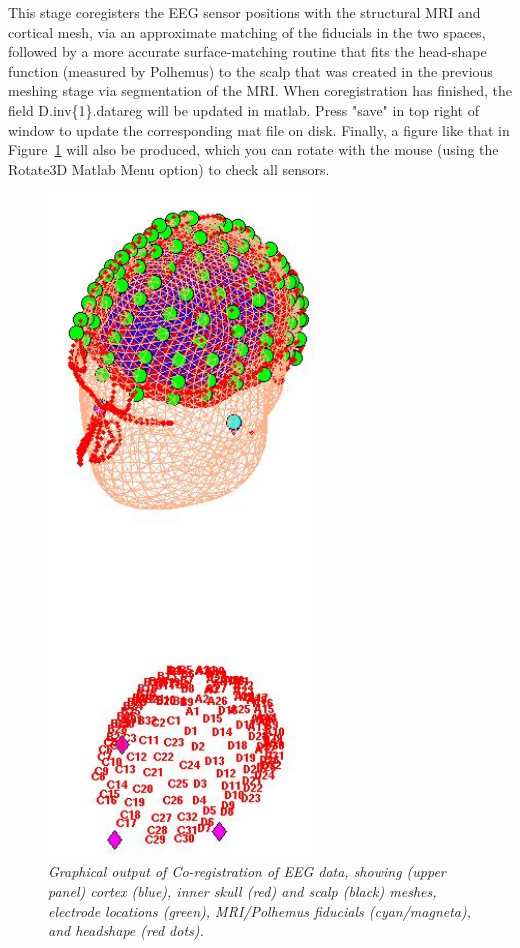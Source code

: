 This stage coregisters the EEG sensor positions with the structural MRI and cortical mesh, via an approximate matching of the fiducials in the two spaces, followed by a more accurate surface-matching routine that fits the head-shape function (measured by Polhemus) to the scalp that was created in the previous meshing stage via segmentation of the MRI. When coregistration has finished, the field D.inv\{1\}.datareg will be updated in matlab. Press "save" in top right of window to update the corresponding mat file on disk. Finally, a figure like that in Figure~\ref{fig_32_8} will also be produced, which you can rotate with the mouse (using the Rotate3D Matlab Menu option) to check all sensors.


\begin{figure}
\begin{center}
\includegraphics[width=70mm]{multimodal/figures/figure_32_8}
\caption{\em  Graphical output of Co-registration of EEG data, showing (upper panel) cortex (blue), inner skull (red) and scalp (black) meshes, electrode locations (green), MRI/Polhemus fiducials (cyan/magneta), and headshape (red dots).\label{fig_32_8}}
\end{center}
\end{figure}

